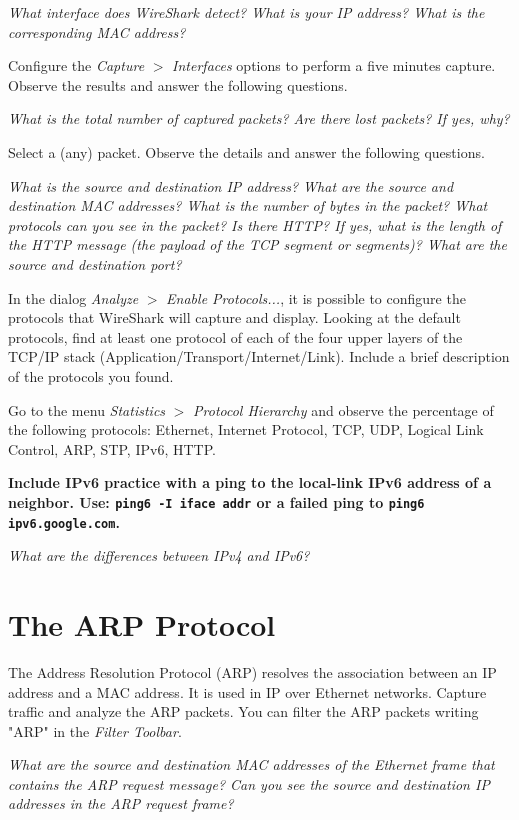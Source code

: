 \emph{What interface does WireShark detect? What is your IP address? What is the corresponding MAC address?}

Configure the \emph{Capture} $>$ \emph{Interfaces} options to perform a five minutes capture. Observe the results and answer the following questions.

\emph{What is the total number of captured packets? Are there lost packets? If yes, why?}

Select a (any) packet. Observe the details and answer the following questions.

\emph{What is the source and destination IP address? What are the source and destination MAC addresses? What is the number of bytes in the packet? What protocols can you see in the packet? Is there HTTP? If yes, what is the length of the HTTP message (the payload of the TCP segment or segments)? What are the source and destination port?}

In the dialog \emph{Analyze} $>$ \emph{Enable Protocols...}, it is possible to configure the protocols that WireShark will capture and display. Looking at the default protocols, find at least one protocol of each of the four upper layers of the TCP/IP stack (Application/Transport/Internet/Link). Include a brief description of the protocols you found.

Go to the menu \emph{Statistics} $>$ \emph{Protocol Hierarchy} and observe the percentage of the following protocols: Ethernet, Internet Protocol, TCP, UDP, Logical Link Control, ARP, STP, IPv6, HTTP.

\textbf{Include IPv6 practice with a ping to the local-link IPv6 address of a neighbor. Use: \texttt{ping6 -I iface addr} or a failed ping to \texttt{ping6 ipv6.google.com}.}

\emph{What are the differences between IPv4 and IPv6?}

\section{The ARP Protocol}

The Address Resolution Protocol (ARP) resolves the association between an IP address and a MAC address. It is used in IP over Ethernet networks. Capture traffic and analyze the ARP packets. You can filter the ARP packets writing "ARP" in the \emph{Filter Toolbar}.

\emph{What are the source and destination MAC addresses of the Ethernet frame that contains the ARP request message? Can you see the source and destination IP addresses in the ARP request frame?}

